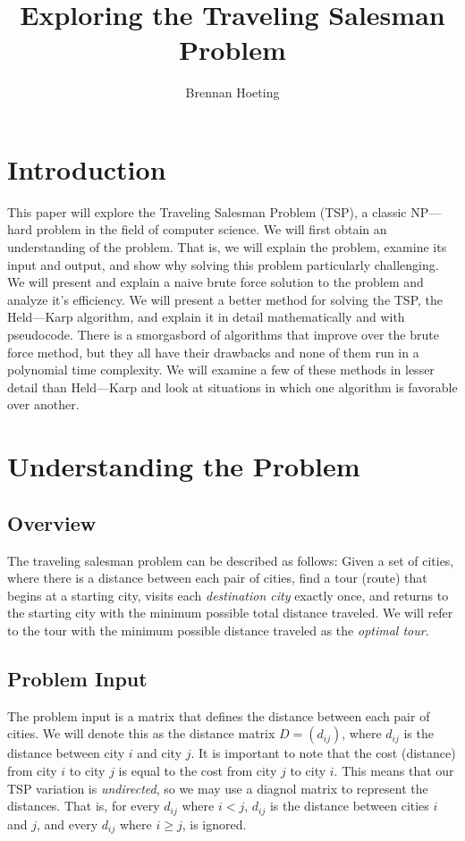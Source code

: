 \documentclass[11pt,fleqn]{article}
\begin{document}

\title{Exploring the Traveling Salesman Problem}
\author{Brennan Hoeting}
\date{}
\maketitle

\section*{Introduction}
This paper will explore the Traveling Salesman Problem (TSP),
a classic NP---hard problem in the field of computer science.
We will first obtain an understanding of the problem. That
is, we will explain the problem, examine its input and output,
and show why solving this problem particularly challenging.
We will present and explain a naive brute force solution to the
problem and analyze it's efficiency.  We will present a better
method for solving the TSP, the Held---Karp algorithm, and explain
it in detail mathematically and with pseudocode.  There is a
smorgasbord of algorithms that improve over the brute force method,
but they all have their drawbacks and none of them run in a polynomial
time complexity.  We will examine a few of these methods in lesser
detail than Held---Karp and look at situations in which one algorithm
is favorable over another.

\section{Understanding the Problem}
\subsection{Overview}
The traveling salesman problem can be described as follows:
Given a set of cities, where there is a distance between
each pair of cities, find a tour (route) that begins at a
starting city, visits each \textit{destination city} exactly once,
and returns to the starting city with the minimum possible
total distance traveled.  We will refer to the tour with the
minimum possible distance traveled as the \textit{optimal tour}.

\subsection{Problem Input}
The problem input is a matrix that defines the distance
between each pair of cities.  We will denote this as
the distance matrix $D = (d_{ij})$, where $d_{ij}$ is
the distance between city $i$ and city $j$.  It is important
to note that the cost (distance) from city $i$ to city $j$ is equal
to the cost from city $j$ to city $i$. This means that our
TSP variation is \textit{undirected}, so we may use a diagnol
matrix to represent the distances.  That is, for every $d_{ij}$
where $i<j$, $d_{ij}$ is the distance between cities $i$ and $j$,
and every $d_{ij}$ where $i\geq j$, is ignored.
\par
\end{document}
